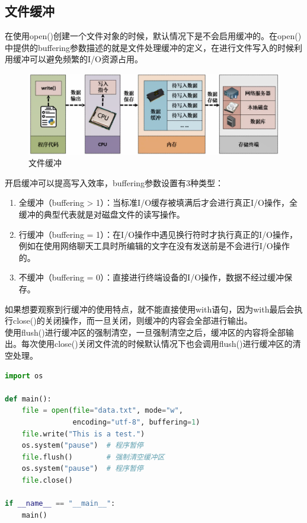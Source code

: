 \subsection{文件缓冲}

在使用open()创建一个文件对象的时候，默认情况下是不会启用缓冲的。在open()中提供的buffering参数描述的就是文件处理缓冲的定义，在进行文件写入的时候利用缓冲可以避免频繁的I/O资源占用。

\begin{figure}[H]
	\centering
	\includegraphics[scale=0.9]{img/C10/10-2/1.png}
	\caption{文件缓冲}
\end{figure}

开启缓冲可以提高写入效率，buffering参数设置有3种类型：

\begin{enumerate}
	\item 全缓冲（buffering > 1）：当标准I/O缓存被填满后才会进行真正I/O操作，全缓冲的典型代表就是对磁盘文件的读写操作。

	\item 行缓冲（buffering = 1）：在I/O操作中遇见换行符时才执行真正的I/O操作，例如在使用网络聊天工具时所编辑的文字在没有发送前是不会进行I/O操作的。

	\item 不缓冲（buffering = 0）：直接进行终端设备的I/O操作，数据不经过缓冲保存。
\end{enumerate}

如果想要观察到行缓冲的使用特点，就不能直接使用with语句，因为with最后会执行close()的关闭操作，而一旦关闭，则缓冲的内容会全部进行输出。\\

使用flush()进行缓冲区的强制清空，一旦强制清空之后，缓冲区的内容将全部输出。每次使用close()关闭文件流的时候默认情况下也会调用flush()进行缓冲区的清空处理。\\


\begin{lstlisting}[language=Python]
import os

def main():
    file = open(file="data.txt", mode="w",
                encoding="utf-8", buffering=1)
    file.write("This is a test.")
    os.system("pause")  # 程序暂停
    file.flush()        # 强制清空缓冲区
    os.system("pause")  # 程序暂停
    file.close()

if __name__ == "__main__":
    main()
\end{lstlisting}

